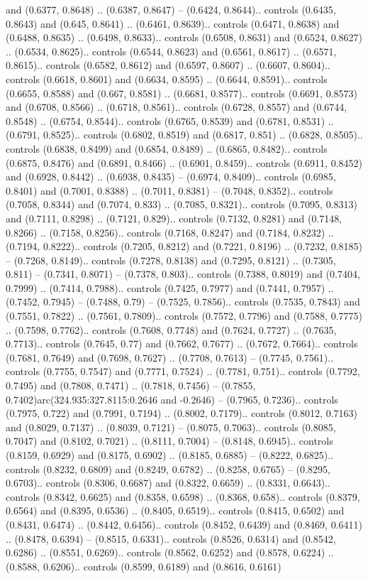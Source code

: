 and (0.6377, 0.8648) .. (0.6387, 0.8647) -- (0.6424, 0.8644).. controls (0.6435, 0.8643) and (0.645, 0.8641) .. (0.6461, 0.8639).. controls (0.6471, 0.8638) and (0.6488, 0.8635) .. (0.6498, 0.8633).. controls (0.6508, 0.8631) and (0.6524, 0.8627) .. (0.6534, 0.8625).. controls (0.6544, 0.8623) and (0.6561, 0.8617) .. (0.6571, 0.8615).. controls (0.6582, 0.8612) and (0.6597, 0.8607) .. (0.6607, 0.8604).. controls (0.6618, 0.8601) and (0.6634, 0.8595) .. (0.6644, 0.8591).. controls (0.6655, 0.8588) and (0.667, 0.8581) .. (0.6681, 0.8577).. controls (0.6691, 0.8573) and (0.6708, 0.8566) .. (0.6718, 0.8561).. controls (0.6728, 0.8557) and (0.6744, 0.8548) .. (0.6754, 0.8544).. controls (0.6765, 0.8539) and (0.6781, 0.8531) .. (0.6791, 0.8525).. controls (0.6802, 0.8519) and (0.6817, 0.851) .. (0.6828, 0.8505).. controls (0.6838, 0.8499) and (0.6854, 0.8489) .. (0.6865, 0.8482).. controls (0.6875, 0.8476) and (0.6891, 0.8466) .. (0.6901, 0.8459).. controls (0.6911, 0.8452) and (0.6928, 0.8442) .. (0.6938, 0.8435) -- (0.6974, 0.8409).. controls (0.6985, 0.8401) and (0.7001, 0.8388) .. (0.7011, 0.8381) -- (0.7048, 0.8352).. controls (0.7058, 0.8344) and (0.7074, 0.833) .. (0.7085, 0.8321).. controls (0.7095, 0.8313) and (0.7111, 0.8298) .. (0.7121, 0.829).. controls (0.7132, 0.8281) and (0.7148, 0.8266) .. (0.7158, 0.8256).. controls (0.7168, 0.8247) and (0.7184, 0.8232) .. (0.7194, 0.8222).. controls (0.7205, 0.8212) and (0.7221, 0.8196) .. (0.7232, 0.8185) -- (0.7268, 0.8149).. controls (0.7278, 0.8138) and (0.7295, 0.8121) .. (0.7305, 0.811) -- (0.7341, 0.8071) -- (0.7378, 0.803).. controls (0.7388, 0.8019) and (0.7404, 0.7999) .. (0.7414, 0.7988).. controls (0.7425, 0.7977) and (0.7441, 0.7957) .. (0.7452, 0.7945) -- (0.7488, 0.79) -- (0.7525, 0.7856).. controls (0.7535, 0.7843) and (0.7551, 0.7822) .. (0.7561, 0.7809).. controls (0.7572, 0.7796) and (0.7588, 0.7775) .. (0.7598, 0.7762).. controls (0.7608, 0.7748) and (0.7624, 0.7727) .. (0.7635, 0.7713).. controls (0.7645, 0.77) and (0.7662, 0.7677) .. (0.7672, 0.7664).. controls (0.7681, 0.7649) and (0.7698, 0.7627) .. (0.7708, 0.7613) -- (0.7745, 0.7561).. controls (0.7755, 0.7547) and (0.7771, 0.7524) .. (0.7781, 0.751).. controls (0.7792, 0.7495) and (0.7808, 0.7471) .. (0.7818, 0.7456) -- (0.7855, 0.7402)arc(324.935:327.8115:0.2646 and -0.2646) -- (0.7965, 0.7236).. controls (0.7975, 0.722) and (0.7991, 0.7194) .. (0.8002, 0.7179).. controls (0.8012, 0.7163) and (0.8029, 0.7137) .. (0.8039, 0.7121) -- (0.8075, 0.7063).. controls (0.8085, 0.7047) and (0.8102, 0.7021) .. (0.8111, 0.7004) -- (0.8148, 0.6945).. controls (0.8159, 0.6929) and (0.8175, 0.6902) .. (0.8185, 0.6885) -- (0.8222, 0.6825).. controls (0.8232, 0.6809) and (0.8249, 0.6782) .. (0.8258, 0.6765) -- (0.8295, 0.6703).. controls (0.8306, 0.6687) and (0.8322, 0.6659) .. (0.8331, 0.6643).. controls (0.8342, 0.6625) and (0.8358, 0.6598) .. (0.8368, 0.658).. controls (0.8379, 0.6564) and (0.8395, 0.6536) .. (0.8405, 0.6519).. controls (0.8415, 0.6502) and (0.8431, 0.6474) .. (0.8442, 0.6456).. controls (0.8452, 0.6439) and (0.8469, 0.6411) .. (0.8478, 0.6394) -- (0.8515, 0.6331).. controls (0.8526, 0.6314) and (0.8542, 0.6286) .. (0.8551, 0.6269).. controls (0.8562, 0.6252) and (0.8578, 0.6224) .. (0.8588, 0.6206).. controls (0.8599, 0.6189) and (0.8616, 0.6161) 